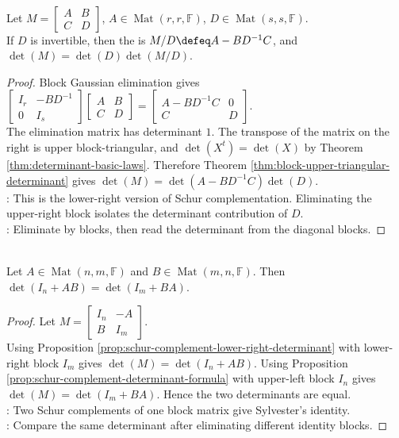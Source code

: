 \begin{proposition} \label{prop:schur-complement-lower-right-determinant} \\
Let $M=
\begin{bmatrix}
A & B\\
C & D
\end{bmatrix}$, $A\in\operatorname{Mat}(r,r,\mathbb{F})$, $D\in\operatorname{Mat}(s,s,\mathbb{F})$.\\
If $D$ is invertible, then the  is $M/D\defeq A-BD^{-1}C$, and $\det(M)=\det(D)\det(M/D)$.
\begin{proof}
Block Gaussian elimination gives $\begin{bmatrix}
I_r & -BD^{-1}\\
0 & I_s
\end{bmatrix}
\begin{bmatrix}
A & B\\
C & D
\end{bmatrix}
=
\begin{bmatrix}
A-BD^{-1}C & 0\\
C & D
\end{bmatrix}$.\\
The elimination matrix has determinant $1$. The transpose of the matrix on the right is upper block-triangular, and $\det(X^t)=\det(X)$ by Theorem \ref{thm:determinant-basic-laws}. Therefore Theorem \ref{thm:block-upper-triangular-determinant} gives $\det(M)=\det(A-BD^{-1}C)\det(D)$.\\
: This is the lower-right version of Schur complementation. Eliminating the upper-right block isolates the determinant contribution of $D$.\\
: Eliminate by blocks, then read the determinant from the diagonal blocks.
\end{proof}
\end{proposition}

\begin{theorem} \label{thm:sylvester-determinant-identity} \\
Let $A\in\operatorname{Mat}(n,m,\mathbb{F})$ and $B\in\operatorname{Mat}(m,n,\mathbb{F})$. Then $\det(I_n+AB)=\det(I_m+BA)$.
\begin{proof}
Let $M=
\begin{bmatrix}
I_n & -A\\
B & I_m
\end{bmatrix}$.\\
Using Proposition \ref{prop:schur-complement-lower-right-determinant} with lower-right block $I_m$ gives $\det(M)=\det(I_n+AB)$. Using Proposition \ref{prop:schur-complement-determinant-formula} with upper-left block $I_n$ gives $\det(M)=\det(I_m+BA)$. Hence the two determinants are equal.\\
: Two Schur complements of one block matrix give Sylvester's identity.\\
: Compare the same determinant after eliminating different identity blocks.
\end{proof}
\end{theorem}

